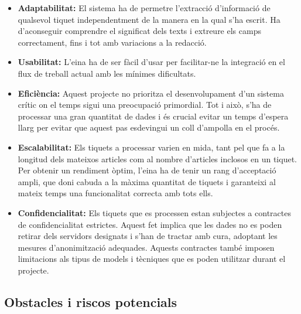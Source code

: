 \begin{itemize}
    \item \textbf{Adaptabilitat:} El sistema ha de permetre l'extracció d'informació de qualsevol tiquet independentment de la manera en la qual s'ha escrit. Ha d'aconseguir comprendre el significat dels texts i extreure els camps correctament, fins i tot amb variacions a la redacció.
    \item \textbf{Usabilitat:} L'eina ha de ser fàcil d'usar per facilitar-ne la integració en el flux de treball actual amb les mínimes dificultats.
    \item \textbf{Eficiència:} Aquest projecte no prioritza el desenvolupament d'un sistema crític on el temps sigui una preocupació primordial. Tot i això, s'ha de processar una gran quantitat de dades i és crucial evitar un temps d'espera llarg per evitar que aquest pas esdevingui un coll d'ampolla en el procés.
    \item \textbf{Escalabilitat:} Els tiquets a processar varien en mida, tant pel que fa a la longitud dels mateixos articles com al nombre d'articles inclosos en un tiquet. Per obtenir un rendiment òptim, l'eina ha de tenir un rang d'acceptació ampli, que doni cabuda a la màxima quantitat de tiquets i garanteixi al mateix temps una funcionalitat correcta amb tots ells.
    \item \textbf{Confidencialitat:} Els tiquets que es processen estan subjectes a contractes de confidencialitat estrictes. Aquest fet implica que les dades no es poden retirar dels servidors designats i s'han de tractar amb cura, adoptant les mesures d'anonimització adequades. Aquests contractes també imposen limitacions als tipus de models i tècniques que es poden utilitzar durant el projecte.
\end{itemize}


\subsection{Obstacles i riscos potencials} \label{ssec:abast-riscos}

